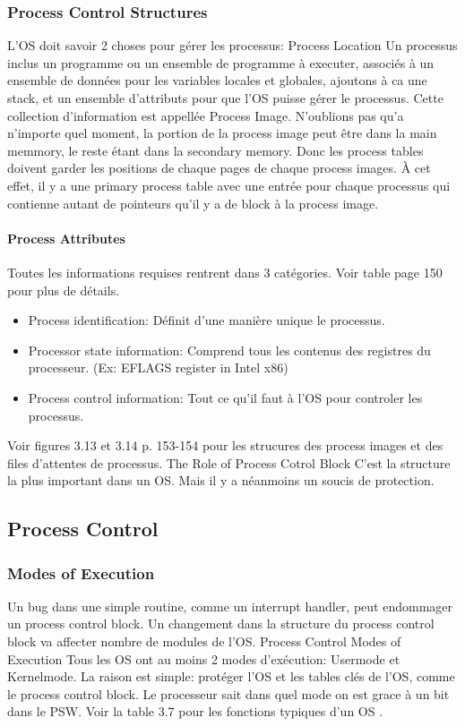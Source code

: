 \subsubsection{Process Control Structures}
L'OS doit savoir 2 choses pour gérer les processus:
Process Location
Un processus inclus un programme ou un ensemble de programme à executer, associés à un ensemble de données pour les variables locales et globales, ajoutons à ca une stack, et un ensemble d'attributs pour que l'OS puisse gérer le processus.
Cette collection d'information est appellée Process Image.
N'oublions pas qu'a n'importe quel moment, la portion de la process image peut être dans la main memmory, le reste étant dans la secondary memory.
Donc les process tables doivent garder les positions de chaque pages de chaque process images.
À cet effet, il y a une primary process table avec une entrée pour chaque processus qui contienne autant de pointeurs qu'il y a de block à la process image.

\paragraph{Process Attributes}
Toutes les informations requises rentrent dans 3 catégories. Voir table page 150 pour plus de détails.
\begin{itemize}
  \item Process identification: Définit d'une manière unique le processus.
  \item Processor state information: Comprend tous les contenus des registres du processeur. (Ex: EFLAGS register in Intel x86)
  \item Process control information: Tout ce qu'il faut à l'OS pour controler les processus.
\end{itemize}
Voir figures 3.13 et 3.14 p. 153-154 pour les strucures des process images et des files d'attentes de processus.
The Role of Process Cotrol Block
C'est la structure la plus important dans un OS. Mais il y a néanmoins un soucis de protection.

\subsection{Process Control}
\subsubsection{Modes of Execution}
Un bug dans une simple routine, comme un interrupt handler, peut endommager un process control block.
Un changement dans la structure du process control block va affecter nombre de modules de l'OS.
Process Control Modes of Execution
Tous les OS ont au moins 2 modes d'exécution: Usermode et Kernelmode. La raison est simple: protéger l'OS et les tables clés de l'OS, comme le process control block. Le processeur sait dans quel mode on est grace à un bit dans le PSW. Voir la table 3.7 pour les fonctions typiques d'un OS \cite[p.~135]{stallings}.

